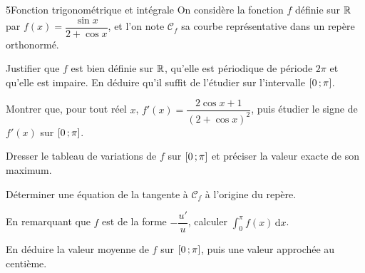 \begin{exoBac}{5}{Fonction trigonométrique et intégrale}
On considère la fonction $f$ définie sur $\mathbb{R}$ par $f(x)=\dfrac{\sin x}{2+\cos x}$, et l'on note $\mathcal{C}_f$ sa courbe
représentative dans un repère orthonormé.
\begin{questions}
  \item Justifier que $f$ est bien définie sur $\mathbb{R}$, qu'elle est périodique de période $2\pi$ et qu'elle est impaire. En déduire qu'il
    suffit de l'étudier sur l'intervalle $\mathopen{[}0\,{;}\,\pi\mathclose{]}$.
  \item Montrer que, pour tout réel $x$, $f'(x)=\dfrac{2\cos x+1}{(2+\cos x)^{2}}$, puis étudier le signe de $f'(x)$ sur $\mathopen{[}0\,{;}\,\pi\mathclose{]}$.
  \item Dresser le tableau de variations de $f$ sur $\mathopen{[}0\,{;}\,\pi\mathclose{]}$ et préciser la valeur exacte de son maximum.
  \item Déterminer une équation de la tangente à $\mathcal{C}_f$ à l'origine du repère.
\end{questions}
\begin{questions}[resume]
  \item En remarquant que $f$ est de la forme $-\dfrac{u'}{u}$, calculer $\displaystyle\int_0^{\pi}f(x)\,\mathrm{d}x$.
  \item En déduire la valeur moyenne de $f$ sur $\mathopen{[}0\,{;}\,\pi\mathclose{]}$, puis une valeur approchée au centième.
\end{questions}
\end{exoBac}
